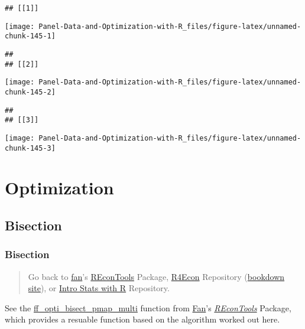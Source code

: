 \documentclass[
]{book}
\begin{document}
\begin{verbatim}
## [[1]]
\end{verbatim}

\begin{center}\texttt{[image: Panel-Data-and-Optimization-with-R\_files/figure-latex/unnamed-chunk-145-1]} \end{center}

\begin{verbatim}
## 
## [[2]]
\end{verbatim}

\begin{center}\texttt{[image: Panel-Data-and-Optimization-with-R\_files/figure-latex/unnamed-chunk-145-2]} \end{center}

\begin{verbatim}
## 
## [[3]]
\end{verbatim}

\begin{center}\texttt{[image: Panel-Data-and-Optimization-with-R\_files/figure-latex/unnamed-chunk-145-3]} \end{center}

\hypertarget{optimization}{%
\chapter{Optimization}\label{optimization}}

\hypertarget{bisection}{%
\section{Bisection}\label{bisection}}

\hypertarget{bisection-1}{%
\subsection{Bisection}\label{bisection-1}}

\begin{quote}
Go back to \href{http://fanwangecon.github.io/}{fan}'s \href{https://fanwangecon.github.io/REconTools/}{REconTools} Package, \href{https://fanwangecon.github.io/R4Econ/}{R4Econ} Repository (\href{https://fanwangecon.github.io/R4Econ/bookdown}{bookdown site}), or \href{https://fanwangecon.github.io/Stat4Econ/}{Intro Stats with R} Repository.
\end{quote}

See the \href{https://fanwangecon.github.io/REconTools/reference/ff_opti_bisect_pmap_multi.html}{ff\_opti\_bisect\_pmap\_multi} function from \href{https://fanwangecon.github.io/}{Fan}'s \emph{\href{https://fanwangecon.github.io/REconTools/}{REconTools}} Package, which provides a resuable function based on the algorithm worked out here.
\end{document}
